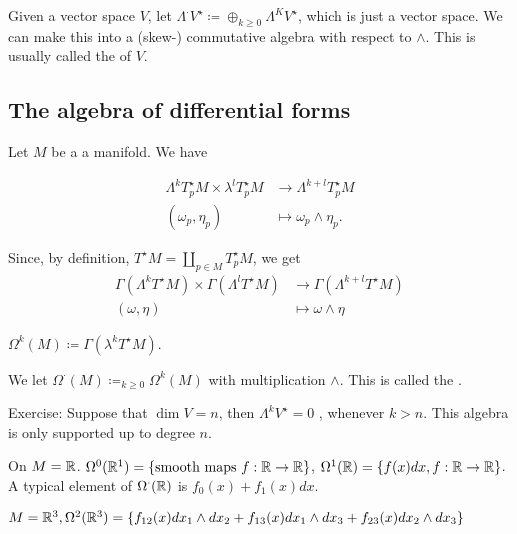\begin{definition*}
    Given a vector space \(V\), let \(\Lambda^\cdot V^\star\coloneqq \oplus_{k\geq 0} \Lambda^KV^\star\),
    which is just a vector space. We can make this into a (skew-) commutative algebra with respect to \(\wedge\).
    This is usually called the  of \(V\).
\end{definition*}

\subsection{The algebra of differential forms}

Let \(M\) be a a manifold. We have 

\begin{align*}
    \Lambda^k T_p^\star M\times \lambda^l T_p^\star M&\to \Lambda^{k+l}T_p^\star M\\
    (\omega_p,\eta_p)&\mapsto \omega_p\wedge \eta_p.
\end{align*}

Since, by definition, \(T^\star M=\coprod_{p\in M} T_p^\star M\), we get 
\begin{align*}
    \Gamma(\Lambda^k T^\star M)\times \Gamma(\Lambda^lT^\star M)&\to \Gamma(\Lambda^{k+l}T^\star M)\\
    (\omega,\eta)&\mapsto \omega \wedge \eta
\end{align*}

 \(\Omega^k(M)\coloneqq \Gamma(\lambda^k T^\star M)\).

We let \(\Omega^\cdot(M)\coloneqq_{k\geq 0} \Omega^k(M)\) with multiplication \(\wedge\).
This is called the .

Exercise: Suppose that \(\dim V=n\), then \(\Lambda^k V^\star=0\) , whenever \(k>n\). This algebra is only supported up to degree \(n\).

\begin{example}
    On \(M=\mathbb{R}\). \(\Omega^0(\mathbb{R}^1)=\{\text{smooth maps }f:\mathbb{R}\to\mathbb{R}\}\),
    \(\Omega^1(\mathbb{R})=\{f(x)dx,f:\mathbb{R}\to\mathbb{R}\}\). A typical element of \(\Omega^\cdot(\mathbb{R})\) is 
    \(f_0(x)+f_1(x)dx\).
\end{example}

\begin{example}
    \(M=\mathbb{R}^3,\Omega^2(\mathbb{R}^3)=\{f_{12}(x)dx_1\wedge dx_2+f_{13}(x)dx_1\wedge dx_3+ f_{23}(x)dx_2\wedge dx_3\}\)
\end{example}

